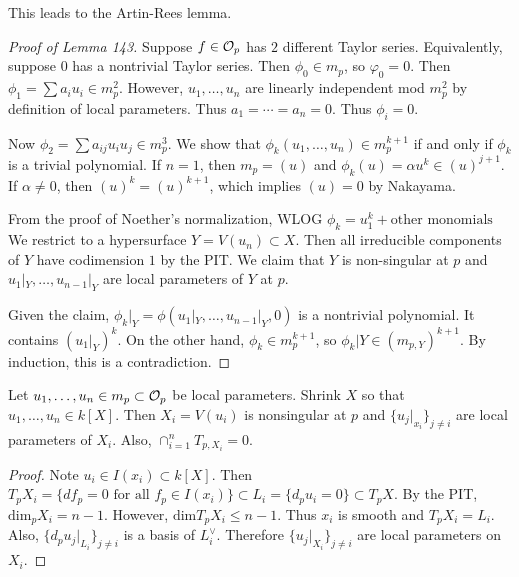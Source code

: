 \documentclass[twoside, 10pt]{article}
\begin{document}
    \begin{rmk} This leads to the Artin-Rees lemma.  \end{rmk}

    \begin{proof}[Proof of Lemma 143] Suppose $f \in \mathcal{O}_p$ has $2$
        different Taylor series. Equivalently, suppose $0$ has a nontrivial
        Taylor series. Then $\phi_0 \in m_p$, so $\varphi_0 = 0$. Then $\phi_1
        = \sum a_i u_i \in m_p^2$. However, $u_1, \ldots, u_n$ are linearly
        independent mod $m_p^2$ by definition of local parameters. Thus $a_1 =
        \cdots = a_n = 0$. Thus $\phi_i = 0$.

        Now $\phi_2 = \sum a_{ij}u_iu_j \in m_p^3$. We show that $\phi_k(u_1,
        \ldots, u_n) \in m_p^{k+1}$ if and only if $\phi_k$ is a trivial
        polynomial. If $n = 1$, then $m_p = (u)$ and $\phi_k(u) = \alpha u^k
        \in (u)^{j+1}$. If $\alpha \neq 0$, then $(u)^k = (u)^{k+1}$, which
        implies $(u) = 0$ by Nakayama.

        From the proof of Noether's normalization, WLOG $\phi_k = u_1^k +
        \text{other monomials}$ We restrict to a hypersurface $Y = V(u_n)
        \subset X$. Then all irreducible components of $Y$ have codimension $1$
        by the PIT. We claim that $Y$ is non-singular at $p$ and $u_1|_Y,
        \ldots, u_{n-1}|_Y$ are local parameters of $Y$ at $p$.

        Given the claim, $\phi_k|_Y = \phi(u_1|_Y, \ldots, u_{n-1}|_Y, 0)$ is a
        nontrivial polynomial. It contains $(u_1|_Y)^k$. On the other hand,
        $\phi_k \in m_p^{k+1}$, so $\phi_k|Y \in (m_{p,Y})^{k+1}$. By
        induction, this is a contradiction.  \end{proof}

    \begin{thm} Let $u_1, \ldots, u_n \in m_p \subset \mathcal{O}_p$ be local
        parameters.  Shrink $X$ so that $u_1, \ldots, u_n \in k[X]$. Then $X_i
        = V(u_i)$ is nonsingular at $p$ and $\{u_j|_{x_i}\}_{j \neq i}$ are
        local parameters of $X_i$. Also, $\cap_{i=1}^n T_{p,X_i} = 0$.
        \begin{proof} Note $u_i \in I(x_i) \subset k[X]$. Then $T_p X_i = \{d
            f_p = 0 \text{ for all } f_p \in I(x_i) \} \subset L_i = \{ d_p u_i
        = 0\} \subset T_p X$. By the PIT, $\mathrm{dim}_p X_i = n-1$. However,
        $\mathrm{dim} T_pX_i \leq n-1$. Thus $x_i$ is smooth and $T_p X_i =
        L_i$. Also, $\{d_p u_j |_{L_i} \}_{j \neq i}$ is a basis of
        $L_i^{\vee}$. Therefore $\{u_j|_{X_i}\}_{j \neq i}$ are local
    parameters on $X_i$.  \end{proof} \end{thm}
\end{document}
